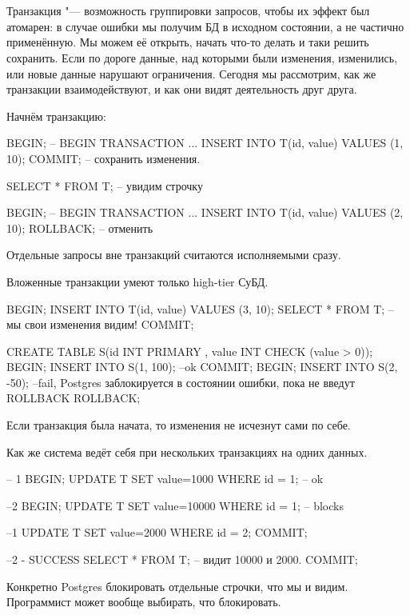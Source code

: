 \chapter{}

Транзакция "--- возможность группировки запросов, чтобы их эффект был атомарен: в случае ошибки мы получим БД в исходном состоянии, а не частично применённую.
Мы можем её открыть, начать что-то делать и таки решить сохранить. Если по дороге данные, над которыми были изменения, изменились, или новые данные нарушают ограничения.
Сегодня мы рассмотрим, как же транзакции взаимодействуют, и как они видят деятельность друг друга.

Начнём транзакцию:
\begin{sqlcode}
BEGIN; -- BEGIN TRANSACTION ...
INSERT INTO T(id, value) VALUES (1, 10);
COMMIT; -- сохранить изменения.

SELECT * FROM T; -- увидим строчку

BEGIN; -- BEGIN TRANSACTION ...
INSERT INTO T(id, value) VALUES (2, 10);
ROLLBACK; -- отменить
\end{sqlcode}

Отдельные запросы вне транзакций считаются исполняемыми сразу.

Вложенные транзакции умеют только high-tier СуБД.

\begin{sqlcode}
BEGIN;
INSERT INTO T(id, value) VALUES (3, 10);
SELECT * FROM T; -- мы свои изменения видим!
COMMIT;

CREATE TABLE S(id INT PRIMARY , value INT CHECK (value > 0));
BEGIN;
INSERT INTO S(1, 100); --ok
COMMIT; BEGIN;
INSERT INTO S(2, -50); --fail, Postgres заблокируется в состоянии ошибки, пока не введут ROLLBACK
ROLLBACK;
\end{sqlcode}
Если транзакция была начата, то изменения не исчезнут сами по себе.

Как же система ведёт себя при нескольких транзакциях на одних данных.
\begin{sqlcode}
-- 1
BEGIN;
UPDATE T SET value=1000 WHERE id = 1; -- ok

--2
BEGIN;
UPDATE T SET value=10000 WHERE id = 1; -- blocks

--1
UPDATE T SET value=2000 WHERE id = 2;
COMMIT;

--2 - SUCCESS
SELECT * FROM T; -- видит 10000 и 2000.
COMMIT;
\end{sqlcode}
Конкретно Postgres блокировать отдельные строчки, что мы и видим.
Программист может вообще выбирать, что блокировать.

